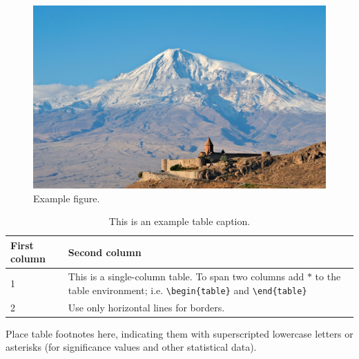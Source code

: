 \documentclass[10pt,twocolumn,twoside]{base/ijb}
\begin{document}
\begin{figure}[b]
	\centering
	\includegraphics[width=\linewidth]{figures/example-figure}
	\caption{Example figure.}
	\label{fig:1}
\end{figure}

\begin{table}[b]
  	\centering\footnotesize\sffamily
  	\caption{This is an example table caption.}
  	\begin{tableminipage}{\linewidth}
    	\begin{tabularx}{\linewidth}{lX}
			\toprule
    		First column & Second column \\
    	  	\midrule
      		1 & This is a single-column table. To span two columns add $\ast$ to the table environment; i.e.  \verb+\begin{table}+ and \verb+\end{table}+ \\
      		2 & Use only horizontal lines for borders. \\
	  		\bottomrule
    	\end{tabularx}
    	\label{tab:4}
    
    	Place table footnotes here, indicating them with superscripted lowercase letters or asterisks (for significance values and other statistical data).
  	\end{tableminipage}
\end{table}
\end{document}
